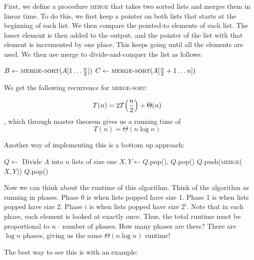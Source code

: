 \begin{algothm}[MergeSort]

    First, we define a procedure \textsc{merge} that takes two sorted lists and merges them in linear time. To do this, we first keep a pointer on both lists that starts at the beginning of each list.
    We then compare the pointed-to elements of each list. The lesser element is then added to the output, and the pointer of the list with that element is incremented
    by one place. This keeps going until all the elements are used. We then use merge to divide-and-conquer the list as follows:
    \begin{algorithmic}
        \State $B \gets \Call{merge-sort}{A[1 \dots \frac{n}{2}]}$
        \State $C \gets \Call{merge-sort}{A[\frac{n}{2} + 1 \dots n]}$
        \State \Return {}
    \EndFunction
    \end{algorithmic}

    We get the following recurrence for \textsc{merge-sort}:

    \[ T(n) = 2 T\qty(\frac{n}{2}) + \Theta(n) \], which through master theorem gives us a running time of
    \[T(n) = \Theta(n \log n) \]
\end{algothm}

Another way of implementing this is a bottom up approach:

\begin{algothm} 
    \begin{algorithmic}
            \State $Q \gets $ Divide $A$ into $n$ lists of size one
                \State $X, Y \gets Q$.pop(), $Q$.pop()
                \State $Q$.push(\textsc{merge}($X, Y$))
            \EndWhile
            \State \Return $Q$.pop()
        \EndFunction
    \end{algorithmic}
    Now we can think about the runtime of this algorithm. Think of the algorithm as running in phases. Phase 0 is when lists popped have size 1.
    Phase 1 is when lists popped have size 2. Phase $i$ is when lists popped have size $2^i$. Note that in each phase, each element is looked at exactly once. Thus,
    the total runtime must be proportional to $n \cdot \text{ number of phases}$. How many phases are there? There are $\log n$ phases, giving us
    the same $\Theta(n \log n)$ runtime!
\end{algothm}


The best way to see this is with an example:

